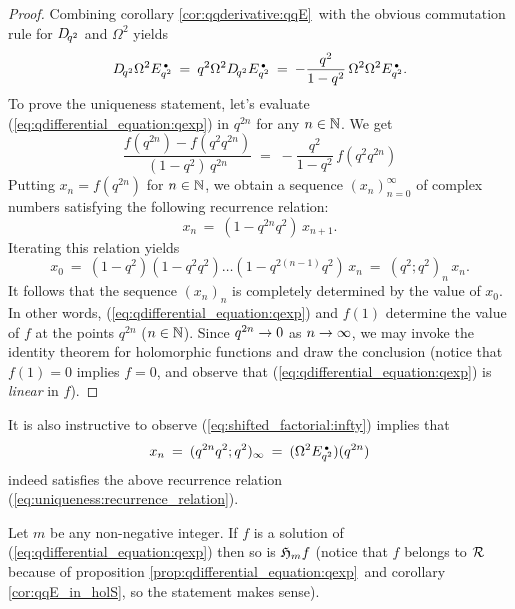 \begin{proof}
Combining corollary \ref{cor:qqderivative:qqE}\ with the obvious
commutation rule for $D_{\!q^2}$ and $\Omega^2$ yields
$$ D_{\!q^2} \Omega^2 E_{q^2}^{\scriptscriptstyle \, \bullet} \:=\: q^2 \Omega^2 D_{\!q^2} E_{q^2}^{\scriptscriptstyle \, \bullet}
             \:=\: -\frac{q^2}{1-q^2}\, \Omega^2 \Omega^2 E_{q^2}^{\scriptscriptstyle \, \bullet}. $$
To prove the uniqueness statement, let's evaluate (\ref{eq:qdifferential_equation:qexp})
in $q^{2n}$ for any $n\in\mathbb{N}$. We get
$$ \frac{f(q^{2n})-f(q^2 q^{2n})}{(1-q^2) \, q^{2n}}
            \;=\;  -\frac{q^2}{1-q^2}\, f(q^2 q^{2n}) $$
Putting $x_n = f(q^{2n})$ for $n\in\mathbb{N}$, we obtain a sequence $(x_n)_{n=0}^\infty$
of complex numbers satisfying the following recurrence relation:
$$ x_n \,=\: (1-q^{2n} q^2)\, x_{n+1}. $$
Iterating this relation yields
\begin{equation}\label{eq:uniqueness:recurrence_relation}
   x_0 \:=\: (1-q^2)(1-q^2 q^2) \ldots (1-q^{2(n-1)} q^2) \, x_n
       \:=\: (q^2;q^2)_n \, x_n.
\end{equation}
It follows that the sequence $(x_n)_n$ is completely determined by
the value of $x_0$. In other words, (\ref{eq:qdifferential_equation:qexp}) and
$f(1)$ determine the value of $f$ at the points $q^{2n}$ ($n\in\mathbb{N}$).
Since $q^{2n} \rightarrow 0$ as $n\rightarrow\infty$, we may invoke the identity theorem
for holomorphic functions and draw the conclusion (notice that $f(1)=0$ implies $f=0$,
and observe that (\ref{eq:qdifferential_equation:qexp}) is {\em linear\/} in $f$).
\end{proof}
\vspace{2ex}


It is also instructive to observe (\ref{eq:shifted_factorial:infty}) implies that
$$ x_n \:=\: (q^{2n} q^2; q^2)_\infty \:=\: (\Omega^2 E_{q^2}^{\scriptscriptstyle \, \bullet})(q^{2n}) $$
indeed satisfies the above recurrence relation (\ref{eq:uniqueness:recurrence_relation}).


\begin{lemma}
Let\/ $m$ be any non-negative integer.
If\/ $f$ is a solution of (\ref{eq:qdifferential_equation:qexp})
then so is\/ $\mathfrak{H}_{m}f$\/
\rm (notice that $f$ belongs to $\mathcal R$ because of proposition
\ref{prop:qdifferential_equation:qexp}\ and corollary \ref{cor:qqE_in_holS},
so the statement makes sense).
\end{lemma}


